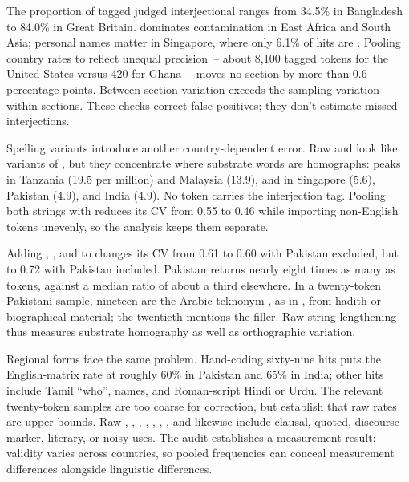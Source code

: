 \documentclass[12pt]{article}
\begin{document}
The proportion of tagged  judged interjectional ranges from 34.5\% in Bangladesh to 84.0\% in Great Britain.  dominates contamination in East Africa and South Asia; personal names matter in Singapore, where only 6.1\% of hits are . Pooling country rates to reflect unequal precision~-- about 8,100 tagged tokens for the United States versus 420 for Ghana~-- moves no section by more than 0.6 percentage points. Between-section variation exceeds the sampling variation within sections. These checks correct false positives; they don't estimate missed interjections.

Spelling variants introduce another country-dependent error. Raw  and  look like variants of , but they concentrate where substrate words are homographs:  peaks in Tanzania (19.5 per million) and Malaysia (13.9), and  in Singapore (5.6), Pakistan (4.9), and India (4.9). No  token carries the interjection tag. Pooling both strings with  reduces its CV from 0.55 to 0.46 while importing non-English tokens unevenly, so the analysis keeps them separate.

Adding , , and  to  changes its CV from 0.61 to 0.60 with Pakistan excluded, but to 0.72 with Pakistan included. Pakistan returns nearly eight times as many  as  tokens, against a median ratio of about a third elsewhere. In a twenty-token Pakistani sample, nineteen are the Arabic teknonym , as in , from hadith or biographical material; the twentieth mentions the filler. Raw-string lengthening thus measures substrate homography as well as orthographic variation.

Regional forms face the same problem. Hand-coding sixty-nine  hits puts the English-matrix rate at roughly 60\% in Pakistan and 65\% in India; other hits include Tamil  \enquote{who}, names, and Roman-script Hindi or Urdu. The relevant twenty-token samples are too coarse for correction, but establish that raw rates are upper bounds. Raw , , , , , , , and  likewise include clausal, quoted, discourse-marker, literary, or noisy uses. The audit establishes a measurement result: validity varies across countries, so pooled frequencies can conceal measurement differences alongside linguistic differences.
\end{document}

